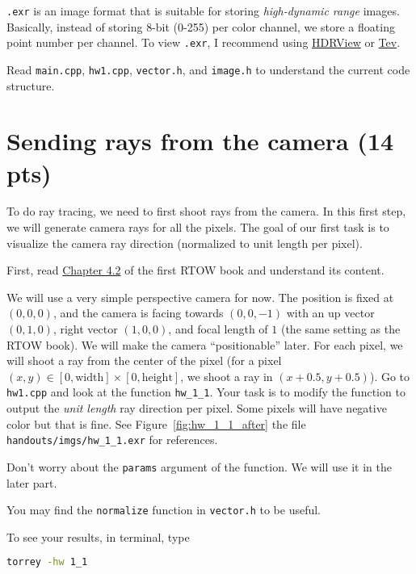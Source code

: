 \lstinline{.exr} is an image format that is suitable for storing \emph{high-dynamic range} images. Basically, instead of storing 8-bit (0-255) per color channel, we store a floating point number per channel. To view \lstinline{.exr}, I recommend using \href{https://github.com/wkjarosz/hdrview}{HDRView} or \href{https://github.com/Tom94/tev}{Tev}.

Read \lstinline{main.cpp}, \lstinline{hw1.cpp}, \lstinline{vector.h}, and \lstinline{image.h} to understand the current code structure.

\section{Sending rays from the camera (14 pts)}
To do ray tracing, we need to first shoot rays from the camera. In this first step, we will generate camera rays for all the pixels. The goal of our first task is to visualize the camera ray direction (normalized to unit length per pixel).

First, read \href{https://raytracing.github.io/books/RayTracingInOneWeekend.html\#rays,asimplecamera,andbackground}{Chapter 4.2} of the first RTOW book and understand its content.

We will use a very simple perspective camera for now. The position is fixed at $(0, 0, 0)$, and the camera is facing towards $(0, 0, -1)$ with an up vector $(0, 1, 0)$, right vector $(1, 0, 0)$, and focal length of $1$ (the same setting as the RTOW book). We will make the camera ``positionable'' later. For each pixel, we will shoot a ray from the center of the pixel (for a pixel $(x, y) \in [0, \text{width}] \times [0, \text{height}]$, we shoot a ray in $(x + 0.5, y + 0.5)$). Go to \lstinline{hw1.cpp} and look at the function \lstinline{hw_1_1}. Your task is to modify the function to output the \emph{unit length} ray direction per pixel. Some pixels will have negative color but that is fine. See Figure~\ref{fig:hw_1_1_after} the file \lstinline{handouts/imgs/hw_1_1.exr} for references.

Don't worry about the \lstinline{params} argument of the function. We will use it in the later part.

You may find the \lstinline{normalize} function in \lstinline{vector.h} to be useful.

To see your results, in terminal, type
\begin{lstlisting}[language=bash]
  torrey -hw 1_1
\end{lstlisting}

